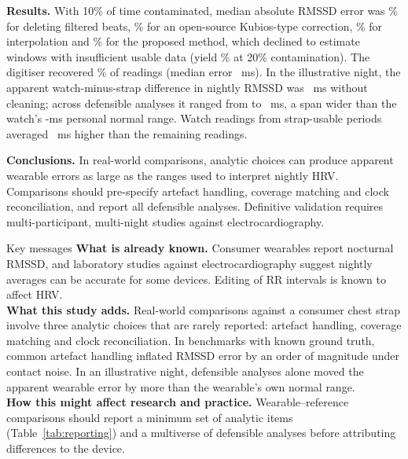 \documentclass[11pt,a4paper]{article}
\begin{document}
\textbf{Results.} With 10\% of time contaminated, median absolute RMSSD error was \benchDeleteTen\% for deleting filtered beats, \benchKubiosTen\% for an open-source Kubios-type correction, \benchInterpTen\% for interpolation and \benchProposedTen\% for the proposed method, which declined to estimate windows with insufficient usable data (yield \benchProposedYieldTwenty\% at 20\% contamination). The digitiser recovered \digRecall\% of readings (median error \digValueMedian{}~ms). In the illustrative night, the apparent watch-minus-strap difference in nightly RMSSD was \pitNone{}~ms without cleaning; across defensible analyses it ranged from \pitDefMin{} to \pitDefMax{}~ms, a span wider than the watch's \normalWidth-ms personal normal range. Watch readings from strap-usable periods averaged \qualityGap{}~ms higher than the remaining readings.

\textbf{Conclusions.} In real-world comparisons, analytic choices can produce apparent wearable errors as large as the ranges used to interpret nightly HRV. Comparisons should pre-specify artefact handling, coverage matching and clock reconciliation, and report all defensible analyses. Definitive validation requires multi-participant, multi-night studies against electrocardiography.

\begin{keybox}{Key messages}
\textbf{What is already known.} Consumer wearables report nocturnal RMSSD, and laboratory studies against electrocardiography suggest nightly averages can be accurate for some devices. Editing of RR intervals is known to affect HRV.\\[3pt]
\textbf{What this study adds.} Real-world comparisons against a consumer chest strap involve three analytic choices that are rarely reported: artefact handling, coverage matching and clock reconciliation. In benchmarks with known ground truth, common artefact handling inflated RMSSD error by an order of magnitude under contact noise. In an illustrative night, defensible analyses alone moved the apparent wearable error by more than the wearable's own normal range.\\[3pt]
\textbf{How this might affect research and practice.} Wearable--reference comparisons should report a minimum set of analytic items (Table~\ref{tab:reporting}) and a multiverse of defensible analyses before attributing differences to the device.
\end{keybox}

\newpage
\linenumbers
\end{document}
